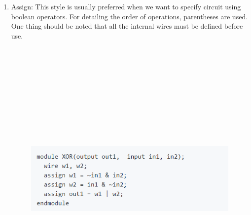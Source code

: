 \documentclass[11pt]{article}
\begin{document}
\begin{enumerate}
\item Assign: 
This style is usually preferred when we want to specify circuit using boolean operators. For detailing the order of operations, parentheses are used. One thing should be noted that all the internal wires must be defined before use.\bigskip
\begin{figure}[ht!]
\centering
\includegraphics[width=11cm,height=14cm,keepaspectratio]{assign.png}
\label{Assign statements exmaple}
\end{figure}


\end{enumerate}
\end{document}
